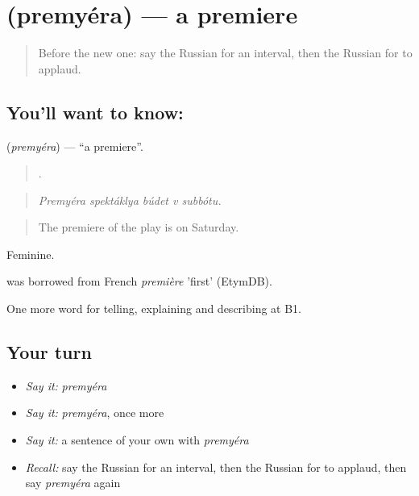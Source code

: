 \section[\texorpdfstring{\ru{премьера} (premyéra)}{премьера (premyéra)}]{ (premyéra) — a premiere}

\label{lesson:RU-C519-premyera}



\begin{quote}
Before the new one: say the Russian for an interval, then the Russian for to applaud.
\end{quote}

\subsection*{You'll want to know: }
\textbf{} (\emph{premyéra}) — \textquotedblleft{}a premiere\textquotedblright{}.

\begin{quote}
    .
\end{quote}

\begin{quote}
\emph{Premyéra spektáklya búdet v subbótu.}
\end{quote}

\begin{quote}
The premiere of the play is on Saturday.
\end{quote}

Feminine.

\begin{cousinweb}
\emph{} was borrowed from French \emph{première} 'first' (EtymDB).
\end{cousinweb}

\begin{grammarlens}[title={What you've built}]
One more word for telling, explaining and describing at B1.
\end{grammarlens}

\subsection*{Your turn}
\begin{itemize}
\raggedright
  \item \emph{Say it:} \emph{premyéra}
  \item \emph{Say it:} \emph{premyéra}, once more
  \item \emph{Say it:} a sentence of your own with \emph{premyéra}
  \item \emph{Recall:} say the Russian for an interval, then the Russian for to applaud, then say \emph{premyéra} again
\end{itemize}

